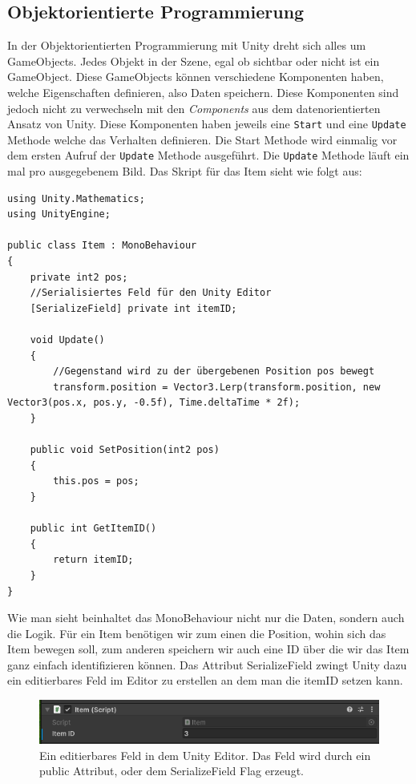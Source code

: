 \subsection{Objektorientierte Programmierung}
In der Objektorientierten Programmierung mit Unity dreht sich alles um GameObjects. Jedes Objekt in der Szene, egal ob sichtbar oder nicht ist ein GameObject. Diese GameObjects können verschiedene Komponenten haben, welche Eigenschaften definieren, also Daten speichern. Diese Komponenten sind jedoch nicht zu verwechseln mit den \textit{Components} aus dem datenorientierten Ansatz von Unity. Diese Komponenten haben jeweils eine \texttt{Start} und eine \texttt{Update} Methode welche das Verhalten definieren. Die Start Methode wird einmalig vor dem ersten Aufruf der \texttt{Update} Methode ausgeführt. Die \texttt{Update} Methode läuft ein mal pro ausgegebenem Bild. Das Skript für das Item sieht wie folgt aus:
\begin{lstlisting}[style=code, caption={Item Komponente OOP}]
using Unity.Mathematics;
using UnityEngine;

public class Item : MonoBehaviour
{
    private int2 pos;
    //Serialisiertes Feld für den Unity Editor
    [SerializeField] private int itemID;

    void Update()
    {
    	//Gegenstand wird zu der übergebenen Position pos bewegt
        transform.position = Vector3.Lerp(transform.position, new Vector3(pos.x, pos.y, -0.5f), Time.deltaTime * 2f);
    }

    public void SetPosition(int2 pos)
    {
        this.pos = pos;
    }

    public int GetItemID()
    {
        return itemID;
    }
}
\end{lstlisting}
Wie man sieht beinhaltet das MonoBehaviour nicht nur die Daten, sondern auch die Logik. Für ein Item benötigen wir zum einen die Position, wohin sich das Item bewegen soll, zum anderen speichern wir auch eine ID über die wir das Item ganz einfach identifizieren können. Das Attribut \glqq SerializeField\grqq{} zwingt Unity dazu ein editierbares Feld im Editor zu erstellen an dem man die itemID setzen kann.
\begin{figure}[H]
\includegraphics[scale=1]{Bilder/SerializeField.png}
\caption{Ein editierbares Feld in dem Unity Editor. Das Feld wird durch ein public Attribut, oder dem SerializeField Flag erzeugt.}
\label{fig:SerializeField}
\end{figure}
